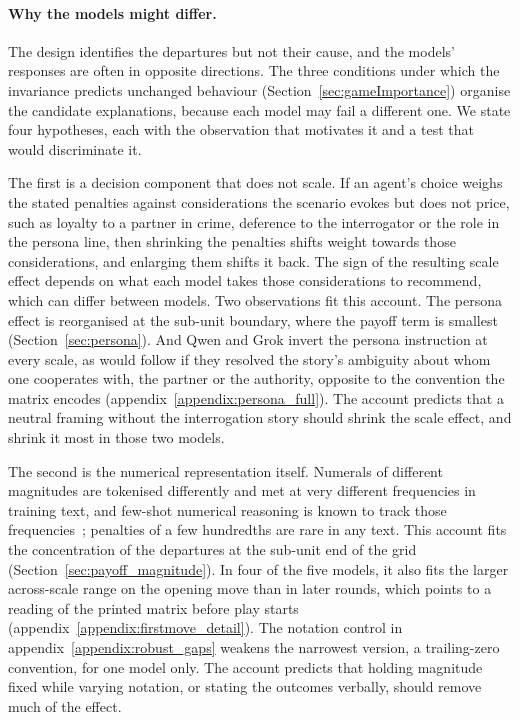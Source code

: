 \documentclass[11pt,a4paper]{article}
\newcommand{\rev}[1]{{\color{red}#1}}
\newcommand{\rev}[1]{#1}
\begin{document}
\rev{\paragraph{Why the models might differ.} The design identifies the
departures but not their cause, and the models' responses are often in
opposite directions. The three conditions under which the invariance predicts
unchanged behaviour (Section~\ref{sec:gameImportance}) organise the candidate
explanations, because each model may fail a different one. We state four
hypotheses, each with the observation that motivates it and a test that would
discriminate it.

The first is a decision component that does not scale. If an agent's choice
weighs the stated penalties against considerations the scenario evokes but
does not price, such as loyalty to a partner in crime, deference to the
interrogator or the role in the persona line, then shrinking the penalties
shifts weight towards those considerations, and enlarging them shifts it back.
The sign of the resulting scale effect depends on what each model takes those
considerations to recommend, which can differ between models. Two observations fit this account. The persona effect is
reorganised at the sub-unit boundary, where the payoff term is smallest
(Section~\ref{sec:persona}). And Qwen and Grok invert the persona instruction
at every scale, as would follow if they resolved the story's ambiguity about
whom one cooperates with, the partner or the authority, opposite to the
convention the matrix encodes (appendix~\ref{appendix:persona_full}). The
account predicts that a neutral framing without the interrogation story should
shrink the scale effect, and shrink it most in those two models.

The second is the numerical representation itself. Numerals of different
magnitudes are tokenised differently and met at very different frequencies in
training text, and few-shot numerical reasoning is known to track those
frequencies~\cite{razeghi2022impact}; penalties of a few hundredths are rare in
any text. This account fits the concentration of the departures at the
sub-unit end of the grid (Section~\ref{sec:payoff_magnitude}). In four of the five models, it also fits the larger across-scale range on the
opening move than in later rounds, which points to a reading of the printed
matrix before play starts (appendix~\ref{appendix:firstmove_detail}). The
notation control in appendix~\ref{appendix:robust_gaps} weakens the narrowest
version, a trailing-zero convention, for one model only. The account predicts that
holding magnitude fixed while varying notation, or stating the outcomes
verbally, should remove much of the effect.

}
\end{document}
